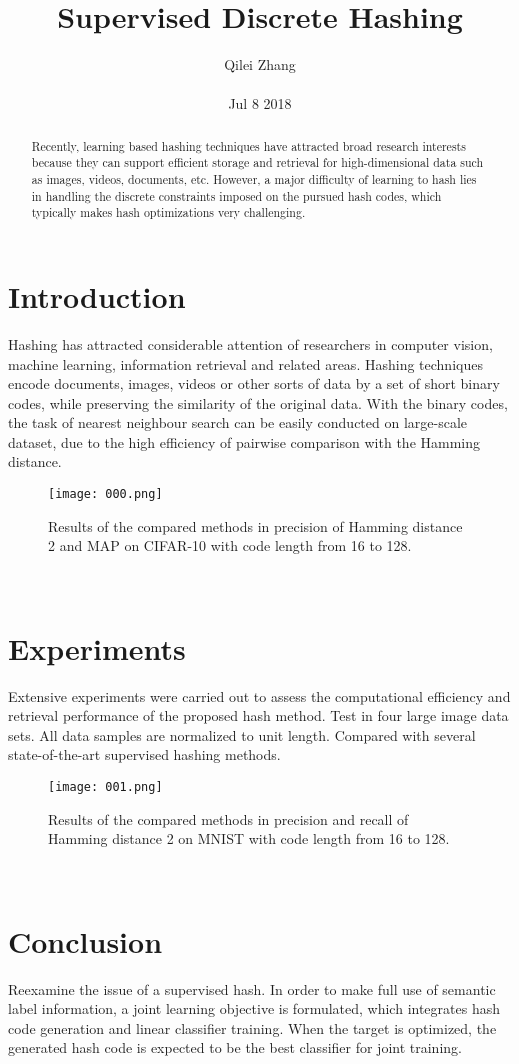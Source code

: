 \documentclass[30pt,twocolumn,letterpaper]{article}
\author{Qilei Zhang\\\\
Jul 8 2018}
\title{Supervised Discrete Hashing}
\begin{document}
\maketitle
\begin{abstract}
  Recently, learning based hashing techniques have attracted broad research interests because they can support efficient storage and retrieval for high-dimensional data such as images, videos, documents, etc. However, a major difficulty of learning to hash lies in handling the discrete constraints imposed on the pursued hash codes, which typically makes hash optimizations very challenging.
\end{abstract}
\section{Introduction}
Hashing has attracted considerable attention of researchers in computer vision, machine learning, information retrieval and related areas. Hashing techniques encode documents, images, videos or other sorts of data by a set of short binary codes, while preserving the similarity of the original data\cite{Gupta2014Biperpedia}. With the binary codes, the task of nearest neighbour search can be easily conducted on large-scale dataset, due to the high efficiency of pairwise comparison with the Hamming distance\cite{Li2017Kernelised}. \\
\begin{figure}[htbp]
\small
\centering
\texttt{[image: 000.png]}
\caption{Results of the compared methods in precision of Hamming distance 2 and MAP on CIFAR-10 with code length from 16 to 128.}
\label{fig:lable}
\end{figure}\\
\section{Experiments}
Extensive experiments were carried out to assess the computational efficiency and retrieval performance of the proposed hash method. Test in four large image data sets. All data samples are normalized to unit length. Compared with several state-of-the-art supervised hashing methods\cite{Mukhtarov2014New}.\\
\begin{figure}[htbp]
\small
\centering
\texttt{[image: 001.png]}
\caption{Results of the compared methods in precision and recall of Hamming distance 2 on MNIST with code length from 16 to 128.}
\label{fig:lable}
\end{figure}\\
\section{Conclusion}
Reexamine the issue of a supervised hash. In order to make full use of semantic label information, a joint learning objective is formulated, which integrates hash code generation and linear classifier training. When the target is optimized, the generated hash code is expected to be the best classifier for joint training\cite{Yao2013Semi}.\\
{\small


}
\end{document}
